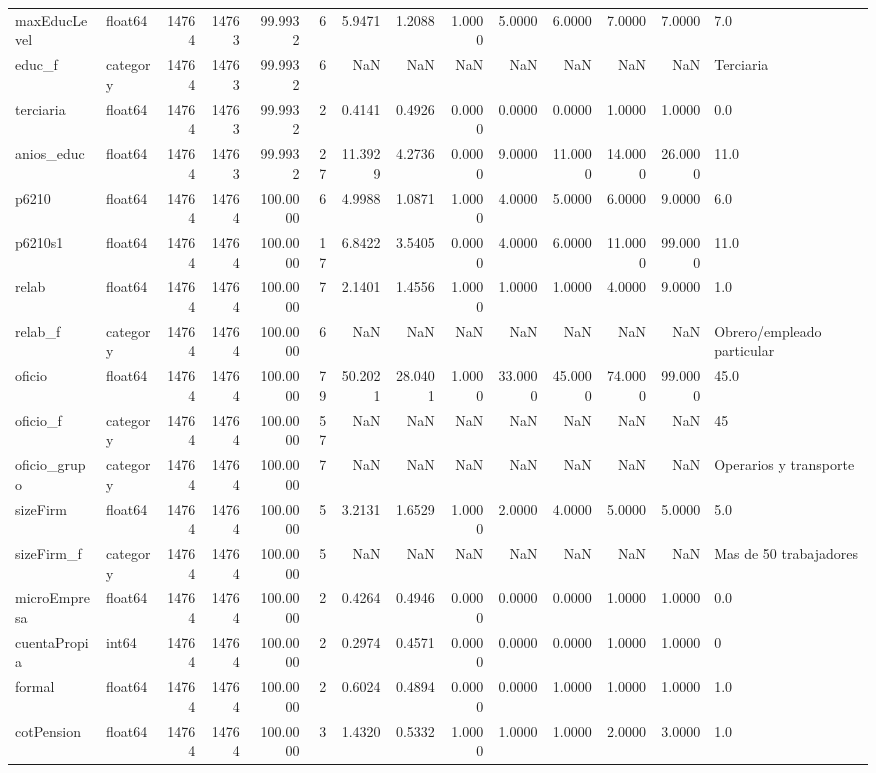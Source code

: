 \begin{longtable}{llrrrrrrrrrrrl}
maxEducLevel & float64 & 14764 & 14763 & 99.9932 & 6 & 5.9471 & 1.2088 & 1.0000 & 5.0000 & 6.0000 & 7.0000 & 7.0000 & 7.0 \\
educ\_f & category & 14764 & 14763 & 99.9932 & 6 & NaN & NaN & NaN & NaN & NaN & NaN & NaN & Terciaria \\
terciaria & float64 & 14764 & 14763 & 99.9932 & 2 & 0.4141 & 0.4926 & 0.0000 & 0.0000 & 0.0000 & 1.0000 & 1.0000 & 0.0 \\
anios\_educ & float64 & 14764 & 14763 & 99.9932 & 27 & 11.3929 & 4.2736 & 0.0000 & 9.0000 & 11.0000 & 14.0000 & 26.0000 & 11.0 \\
p6210 & float64 & 14764 & 14764 & 100.0000 & 6 & 4.9988 & 1.0871 & 1.0000 & 4.0000 & 5.0000 & 6.0000 & 9.0000 & 6.0 \\
p6210s1 & float64 & 14764 & 14764 & 100.0000 & 17 & 6.8422 & 3.5405 & 0.0000 & 4.0000 & 6.0000 & 11.0000 & 99.0000 & 11.0 \\
relab & float64 & 14764 & 14764 & 100.0000 & 7 & 2.1401 & 1.4556 & 1.0000 & 1.0000 & 1.0000 & 4.0000 & 9.0000 & 1.0 \\
relab\_f & category & 14764 & 14764 & 100.0000 & 6 & NaN & NaN & NaN & NaN & NaN & NaN & NaN & Obrero/empleado particular \\
oficio & float64 & 14764 & 14764 & 100.0000 & 79 & 50.2021 & 28.0401 & 1.0000 & 33.0000 & 45.0000 & 74.0000 & 99.0000 & 45.0 \\
oficio\_f & category & 14764 & 14764 & 100.0000 & 57 & NaN & NaN & NaN & NaN & NaN & NaN & NaN & 45 \\
oficio\_grupo & category & 14764 & 14764 & 100.0000 & 7 & NaN & NaN & NaN & NaN & NaN & NaN & NaN & Operarios y transporte \\
sizeFirm & float64 & 14764 & 14764 & 100.0000 & 5 & 3.2131 & 1.6529 & 1.0000 & 2.0000 & 4.0000 & 5.0000 & 5.0000 & 5.0 \\
sizeFirm\_f & category & 14764 & 14764 & 100.0000 & 5 & NaN & NaN & NaN & NaN & NaN & NaN & NaN & Mas de 50 trabajadores \\
microEmpresa & float64 & 14764 & 14764 & 100.0000 & 2 & 0.4264 & 0.4946 & 0.0000 & 0.0000 & 0.0000 & 1.0000 & 1.0000 & 0.0 \\
cuentaPropia & int64 & 14764 & 14764 & 100.0000 & 2 & 0.2974 & 0.4571 & 0.0000 & 0.0000 & 0.0000 & 1.0000 & 1.0000 & 0 \\
formal & float64 & 14764 & 14764 & 100.0000 & 2 & 0.6024 & 0.4894 & 0.0000 & 0.0000 & 1.0000 & 1.0000 & 1.0000 & 1.0 \\
cotPension & float64 & 14764 & 14764 & 100.0000 & 3 & 1.4320 & 0.5332 & 1.0000 & 1.0000 & 1.0000 & 2.0000 & 3.0000 & 1.0 \\

\end{longtable}
